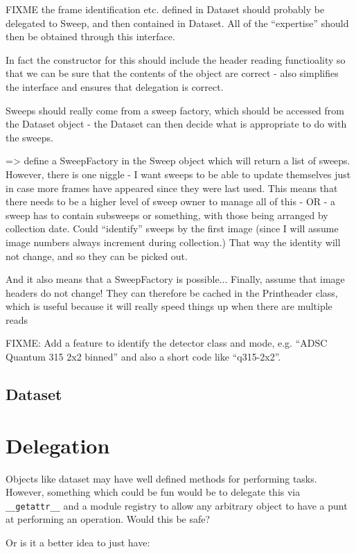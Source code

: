 \documentclass[a4paper, 11pt]{article}
\begin{document}
FIXME the frame identification etc. defined in Dataset should probably be
delegated to Sweep, and then contained in Dataset. All of the ``expertise'' 
should then be obtained through this interface.

In fact the constructor for this should include the header reading 
functioality so that we can be sure that the contents of the object
are correct - also simplifies the interface and ensures that delegation
is correct.

Sweeps should really come from a sweep factory, which should be accessed
from the Dataset object - the Dataset can then decide what is appropriate to
do with the sweeps.

=> define a SweepFactory in the Sweep object which will return a list of 
sweeps. However, there is one niggle - I want sweeps to be able to update
themselves just in case more frames have appeared since they were last
used. This means that there needs to be a higher level of sweep owner
to manage all of this - OR - a sweep has to contain subsweeps or something, 
with those being arranged by collection date. Could ``identify'' sweeps by
the first image (since I will assume image numbers always increment during 
collection.) That way the identity will not change, and so they can be picked 
out.

And it also means that a SweepFactory is possible... Finally, assume that 
image headers do not change! They can therefore be cached in the Printheader
class, which is useful because it will really speed things up when there are
multiple reads

FIXME: Add a feature to identify the detector class and mode, e.g. ``ADSC
Quantum 315 2x2 binned'' and also a short code like ``q315-2x2''.

\subsection{Dataset}

\section{Delegation}

Objects like dataset may have well defined methods for performing tasks.
However, something which could be fun would be to delegate this via
\verb|__getattr__| and a module registry to allow any arbitrary object to
have a punt at performing an operation. Would this be safe?

Or is it a better idea to just have:
\end{document}
